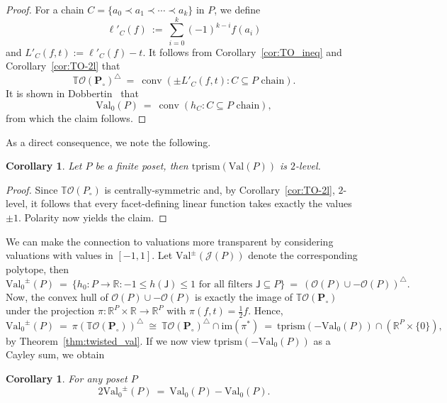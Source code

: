\documentclass[11pt]{amsart}
\newtheorem{cor}[thm]{Corollary}
\theoremstyle{definition}
\begin{document}
\begin{proof}
    For a chain $C = \{ a_0 \prec a_1 \prec \cdots \prec a_k \}$ in ${P}$, we
    define
    \[
        \ell'_C(f) \ := \ \sum_{i=0}^k (-1)^{k-i} f(a_i)
    \]
    and $L'_C(f,t) :=  \ell'_C(f) - t$. It follows from
    Corollary~\ref{cor:TO_ineq} and Corollary~\ref{cor:TO-2l} that 
    \[
        {{\mathbb{T}}{\mathcal{O}({{{\mathbf{P}}_\circ}})}}^{\triangle} \ = \ \operatorname{conv} ( \pm L'_C(f,t) : C \subseteq {P}
        \text{ chain} ).
    \]
    It is shown in Dobbertin~\cite[Theorem~B]{Dobbertin} that 
    \[
        {{\mathrm{Val}}_0}({P}) \ = \ \operatorname{conv}\left( h_C :  C \subseteq
        {P} \text{ chain} \right),
    \]
    from which the claim follows.
\end{proof}

As a direct consequence, we note the following.
\begin{cor}\label{cor:val_2l}
    Let ${P}$ be a finite poset, then ${\mathrm{tprism}({{\mathrm{Val}}({P})})}$ is $2$-level.
\end{cor}
\begin{proof}
    Since ${{\mathbb{T}}{\mathcal{O}({{{P}_\circ}})}}$ is centrally-symmetric and, by
    Corollary~\ref{cor:TO-2l}, $2$-level,  it follows that every
    facet-defining linear function takes exactly the values $\pm 1$. Polarity
    now yields the claim.
\end{proof}
        
We can make the connection to valuations more transparent by considering
valuations with values in $[-1,1]$. Let ${\mathrm{Val}}^\pm({\mathcal{J}}({P}))$ denote the
corresponding polytope, then
\[
    {{\mathrm{Val}}_0}^\pm({P}) \ = \ \{ h_0 : {P} \rightarrow {\mathbb{R}} : -1 \le
    h({\mathsf{J}}) \le 1 \text{ for all filters } {\mathsf{J}} \subseteq {P} \}
    \ = \ ({\mathcal{O}({P})} \cup -{\mathcal{O}({P})})^{\triangle}.
\]
Now, the convex hull of ${\mathcal{O}({P})} \cup -{\mathcal{O}({P})}$ is exactly the image of
${{\mathbb{T}}{\mathcal{O}({{{\mathbf{P}}_\circ}})}}$ under the projection $\pi : {\mathbb{R}}^{P} \times {\mathbb{R}} \rightarrow
{\mathbb{R}}^{P}$ with $\pi(f,t) = \frac{1}{2}f$. Hence,
\[
    {{\mathrm{Val}}_0}^\pm({P}) \ = \ \pi({{\mathbb{T}}{\mathcal{O}({{{\mathbf{P}}_\circ}})}})^{\triangle} \ \cong \
    {{\mathbb{T}}{\mathcal{O}({{{\mathbf{P}}_\circ}})}}^{\triangle} \cap \mathrm{im}(\pi^*) \ = \ 
    {\mathrm{tprism}({-{{\mathrm{Val}}_0}({P})})}\cap ({\mathbb{R}}^{P} \times \{0\}),
\]
by Theorem~\ref{thm:twisted_val}.  If we now view ${\mathrm{tprism}({-{{\mathrm{Val}}_0}({P})})}$ as a
Cayley sum, we obtain
\begin{cor}\label{cor:val_pm}
    For any poset ${P}$
    \[
        2{{\mathrm{Val}}_0}^\pm({P})  \ = \ {{\mathrm{Val}}_0}({P}) -
        {{\mathrm{Val}}_0}({P}).
    \]
\end{cor}
\end{document}
